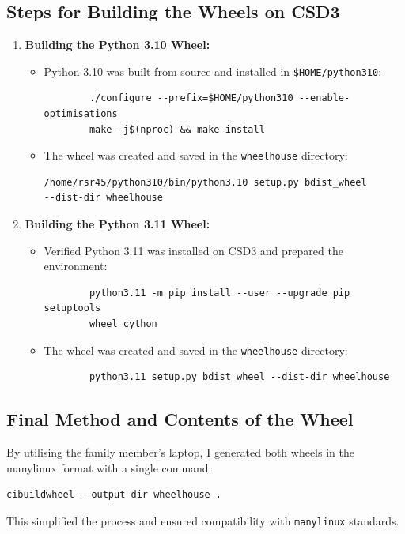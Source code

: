 \documentclass[a4paper,12pt]{article}
\begin{document}
\subsection{Steps for Building the Wheels on CSD3}
\begin{enumerate}
    \item \textbf{Building the Python 3.10 Wheel:}
    \begin{itemize}
        \item Python 3.10 was built from source and installed in \texttt{\$HOME/python310}:
        \begin{verbatim}
        ./configure --prefix=$HOME/python310 --enable-optimisations
        make -j$(nproc) && make install
        \end{verbatim}
        \item The wheel was created and saved in the \texttt{wheelhouse} directory:
        \begin{verbatim}
/home/rsr45/python310/bin/python3.10 setup.py bdist_wheel 
--dist-dir wheelhouse
        \end{verbatim}
    \end{itemize}

    \item \textbf{Building the Python 3.11 Wheel:}
    \begin{itemize}
        \item Verified Python 3.11 was installed on CSD3 and prepared the environment:
        \begin{verbatim}
        python3.11 -m pip install --user --upgrade pip setuptools 
        wheel cython
        \end{verbatim}
        \item The wheel was created and saved in the \texttt{wheelhouse} directory:
        \begin{verbatim}
        python3.11 setup.py bdist_wheel --dist-dir wheelhouse
        \end{verbatim}
    \end{itemize}
\end{enumerate}

\subsection{Final Method and Contents of the Wheel}
By utilising the family member's laptop, I generated both wheels in the manylinux format with a single command:
\begin{verbatim}
cibuildwheel --output-dir wheelhouse .
\end{verbatim}
This simplified the process and ensured compatibility with \texttt{manylinux} standards.
\end{document}
